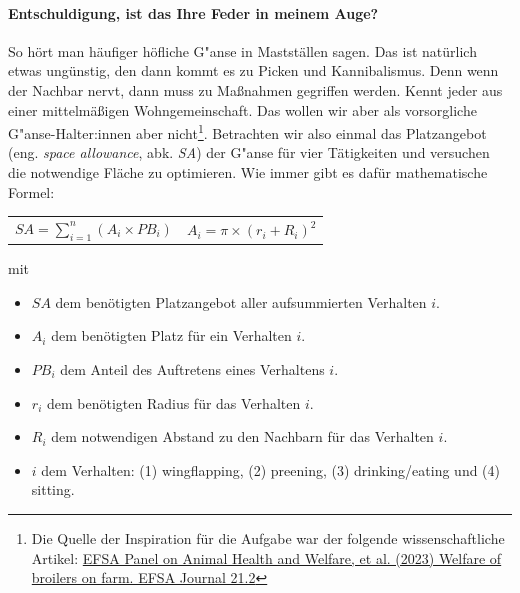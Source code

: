 \documentclass[a4paper, 10pt]{scrartcl}\usepackage[]{graphicx}\usepackage[]{xcolor}
\begin{document}
\paragraph{Entschuldigung,  ist das Ihre Feder in meinem Auge?}



So h{\"o}rt man h{\"a}ufiger h{\"o}fliche G{"a}nse in Mastst{\"a}llen sagen. Das
ist nat{\"u}rlich etwas ung{\"u}nstig, den dann kommt es zu Picken und
Kannibalismus. Denn wenn der Nachbar nervt, dann muss zu Ma{\ss}nahmen
gegriffen werden. Kennt jeder aus einer mittelm{\"a}{\ss}igen Wohngemeinschaft. Das
wollen wir aber als vorsorgliche G{"a}nse-Halter:innen aber
nicht\footnote{Die Quelle der Inspiration f{\"u}r die Aufgabe war der folgende
  wissenschaftliche Artikel:
  \href{https://www.efsa.europa.eu/en/efsajournal/pub/7788}{EFSA Panel on
    Animal Health and Welfare, et al. (2023) Welfare of broilers on
    farm. EFSA Journal 21.2}}. Betrachten wir also einmal das Platzangebot
(eng. \textit{space allowance}, abk. \textit{SA}) der G{"a}nse
f{\"u}r vier T{\"a}tigkeiten und versuchen die notwendige Fl{\"a}che zu optimieren. Wie
immer gibt es daf{\"u}r mathematische Formel:


\begin{center}
  \begin{tabular}{cc}
    $SA = \sum^n_{i = 1} (A_i \times PB_i)$ & $A_i = \pi \times (r_i + R_i)^2$\\
  \end{tabular}
\end{center}

\vspace{-2Ex}

mit

\begin{itemize}[noitemsep]
\item $SA$ dem ben{\"o}tigten Platzangebot aller aufsummierten Verhalten $i$.
\item $A_i$ dem ben{\"o}tigten Platz f{\"u}r ein Verhalten $i$. 
\item $PB_i$ dem Anteil des Auftretens eines Verhaltens $i$.
\item $r_i$ dem ben{\"o}tigten Radius f{\"u}r das Verhalten $i$.
\item $R_i$ dem notwendigen Abstand zu den Nachbarn f{\"u}r das Verhalten $i$.    
\item $i$ dem Verhalten: (1) wingflapping, (2) preening, (3)
  drinking/eating und (4) sitting.
\end{itemize}
\end{document}
